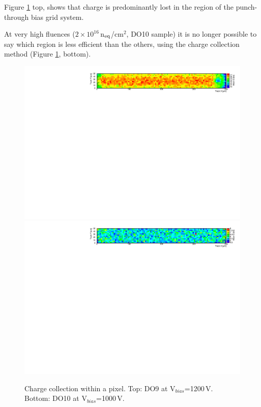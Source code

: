 Figure \ref{fig:n-in-n:Oct_P5_D11_qeff} top, shows that charge is predominantly
 lost in the region of the punch-through bias grid system.

 At very high fluences ($2\times 10^{16}$\,n$_{\rm eq}$/cm$^2$, DO10 sample)
 it is no longer possible to say which region is less efficient than the others, using the charge collection method
 (Figure \ref{fig:n-in-n:Oct_P5_D11_qeff}, bottom).
\begin{figure}[!htb]
 \begin{center}
  \includegraphics[width=1\textwidth]{Oct_P8_1_9_9_1_D10_qeff.pdf}
  \includegraphics[width=1\textwidth]{Oct_P5_D11_qeff.pdf}
 \end{center}
 \caption{\label{fig:n-in-n:Oct_P5_D11_qeff}Charge collection within a pixel. Top: DO9 at V$_{bias}$=1200\,V. Bottom: DO10 at V$_{bias}$=1000\,V.}
\end{figure}

